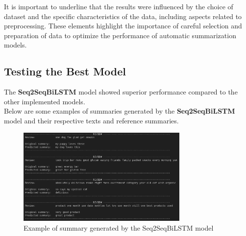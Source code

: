 It is important to underline that the results were influenced by the choice of dataset and the specific characteristics of the data,
including aspects related to preprocessing. These elements highlight the importance of careful selection and preparation of data to
optimize the performance of automatic summarization models.

\subsection{Testing the Best Model}
The \textbf{Seq2SeqBiLSTM} model showed superior performance compared to the other implemented models.\\
Below are some examples of summaries generated by the \textbf{Seq2SeqBiLSTM} model and their respective texts and reference summaries.\\

\begin{figure}[H]
    \centering
    \includegraphics[width=0.75\textwidth]{media/Seq2SeqBiLSTM_inference.png}
    \caption{Example of summary generated by the Seq2SeqBiLSTM model}
    \label{fig:example1}
\end{figure}